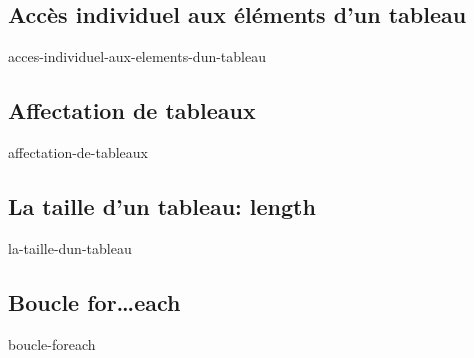 \subsection{Accès individuel aux éléments d'un tableau}\label{subsec:acces-individuel-aux-elements-dun-tableau}
    {acces-individuel-aux-elements-dun-tableau}
\subsection{Affectation de tableaux}\label{subsec:affectation-de-tableaux}
    {affectation-de-tableaux}
\subsection{La taille d'un tableau: length}\label{subsec:la-taille-dun-tableau}
    {la-taille-dun-tableau}
\subsection{Boucle for\ldots each}\label{subsec:boucle-foreach}
    {boucle-foreach}